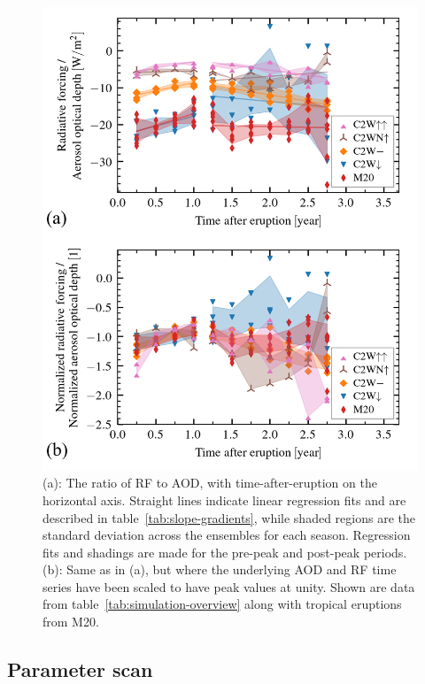 \documentclass[draft]{agujournal2019}
\begin{document}
\begin{figure}
  \centering
  \includegraphics{figure3.png}

  \caption{(a): The ratio of RF to AOD, with time-after-eruption on the horizontal axis.
    Straight lines indicate linear regression fits and are described in
    table~\ref{tab:slope-gradients}, while shaded regions are the standard deviation across
    the ensembles for each season. Regression fits and shadings are made for the pre-peak
    and post-peak periods. (b): Same as in (a), but where the underlying AOD and RF time
    series have been scaled to have peak values at unity. Shown are data from
    table~\ref{tab:simulation-overview} along with tropical eruptions from
    M20.}\label{fig:3_rf_to_aod_ratios}%
\end{figure}

\subsection{Parameter scan}
\end{document}
